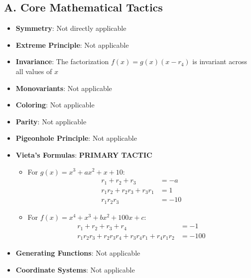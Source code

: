 \documentclass[]{article}
\begin{document}
\begin{tacticalbox}
\subsection*{A. Core Mathematical Tactics}
\begin{itemize}[leftmargin=*]
    \item \textbf{Symmetry}: Not directly applicable
    
    \item \textbf{Extreme Principle}: Not applicable
    
    \item \textbf{Invariance}: The factorization $f(x) = g(x)(x-r_4)$ is invariant across all values of $x$
    
    \item \textbf{Monovariants}: Not applicable
    
    \item \textbf{Coloring}: Not applicable
    
    \item \textbf{Parity}: Not applicable
    
    \item \textbf{Pigeonhole Principle}: Not applicable
    
    \item \textbf{Vieta's Formulas}: \textbf{PRIMARY TACTIC}
    \begin{itemize}
        \item For $g(x) = x^3 + ax^2 + x + 10$: 
        \begin{align*}
            r_1 + r_2 + r_3 &= -a \\
            r_1r_2 + r_2r_3 + r_3r_1 &= 1 \\
            r_1r_2r_3 &= -10
        \end{align*}
        
        \item For $f(x) = x^4 + x^3 + bx^2 + 100x + c$:
        \begin{align*}
            r_1 + r_2 + r_3 + r_4 &= -1 \\
            r_1r_2r_3 + r_2r_3r_4 + r_3r_4r_1 + r_4r_1r_2 &= -100
        \end{align*}
    \end{itemize}
    
    \item \textbf{Generating Functions}: Not applicable
    
    \item \textbf{Coordinate Systems}: Not applicable
\end{itemize}


\end{tacticalbox}
\end{document}
